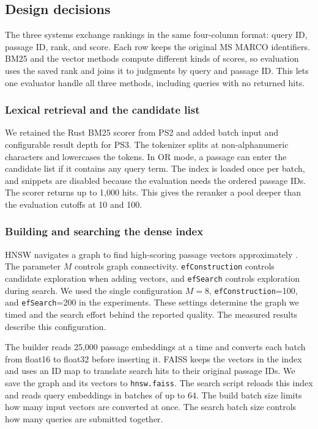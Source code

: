 \documentclass[11pt,letterpaper]{article}
\begin{document}
\newpage
\subsection{Design decisions}
The three systems exchange rankings in the same four-column format: query ID, passage ID, rank, and score. Each row keeps the original MS MARCO identifiers. BM25 and the vector methods compute different kinds of scores, so evaluation uses the saved rank and joins it to judgments by query and passage ID. This lets one evaluator handle all three methods, including queries with no returned hits.

\subsubsection*{Lexical retrieval and the candidate list}
We retained the Rust BM25 scorer from PS2 and added batch input and configurable result depth for PS3. The tokenizer splits at non-alphanumeric characters and lowercases the tokens. In OR mode, a passage can enter the candidate list if it contains any query term. The index is loaded once per batch, and snippets are disabled because the evaluation needs the ordered passage IDs. The scorer returns up to 1,000 hits. This gives the reranker a pool deeper than the evaluation cutoffs at 10 and 100.

\subsubsection*{Building and searching the dense index}
HNSW navigates a graph to find high-scoring passage vectors approximately \cite{hnsw}. The parameter \(M\) controls graph connectivity. \texttt{efConstruction} controls candidate exploration when adding vectors, and \texttt{efSearch} controls exploration during search. We used the single configuration \(M=8\), \texttt{efConstruction}=100, and \texttt{efSearch}=200 in the experiments. These settings determine the graph we timed and the search effort behind the reported quality. The measured results describe this configuration.

The builder reads 25,000 passage embeddings at a time and converts each batch from float16 to float32 before inserting it. FAISS keeps the vectors in the index and uses an ID map to translate search hits to their original passage IDs. We save the graph and its vectors to \texttt{hnsw.faiss}. The search script reloads this index and reads query embeddings in batches of up to 64. The build batch size limits how many input vectors are converted at once. The search batch size controls how many queries are submitted together.
\end{document}
